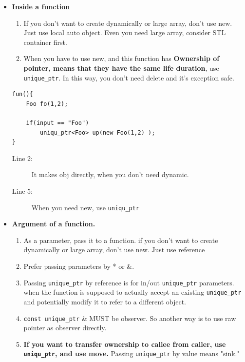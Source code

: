 \documentclass[a4paper,11pt,twoside]{book}
\begin{document}
\begin{itemize}

    \item \textbf{Inside a function}

\begin{enumerate}
    \item If you don't want to create dynamically or large array, don't use new. Just use local auto object. Even you need large array, consider STL container first.

    \item When you have to use new, and this function has \textbf{Ownership of pointer, means that they have the same life duration},  use \texttt{unique\_ptr}. In this way, you don't need delete and it's exception safe.
\end{enumerate}
\begin{lstlisting}
fun(){
	Foo fo(1,2);
	
	if(input == "Foo")
		uniqu_ptr<Foo> up(new Foo(1,2) );
}
\end{lstlisting}
\begin{description}
	\item[Line 2:] It makes obj directly, when you don't need dynamic.
	\item[Line 5:] When you need new, use \texttt{uniqu\_ptr}
\end{description}


    \item \textbf{Argument of a function.}

\begin{enumerate}
    \item As a parameter, pass it to a function. if you don't want to create dynamically or large array, don't use new. Just use reference

    \item Prefer passing parameters by * or \&.

    \item Passing \texttt{unique\_ptr} by reference is for in/out \texttt{unique\_ptr} parameters. when the function is supposed to actually accept an existing \texttt{unique\_ptr} and potentially modify it to refer to a different object. 

    \item \texttt{const unique\_ptr} \& MUST be observer. So another way is to use raw pointer as observer directly.

    \item \textbf{If you want to transfer ownership to callee from caller, use \texttt{uniqu\_ptr}, and use move.} Passing \texttt{unique\_ptr} by value means "sink."


\end{enumerate}
\end{itemize}
\end{document}
